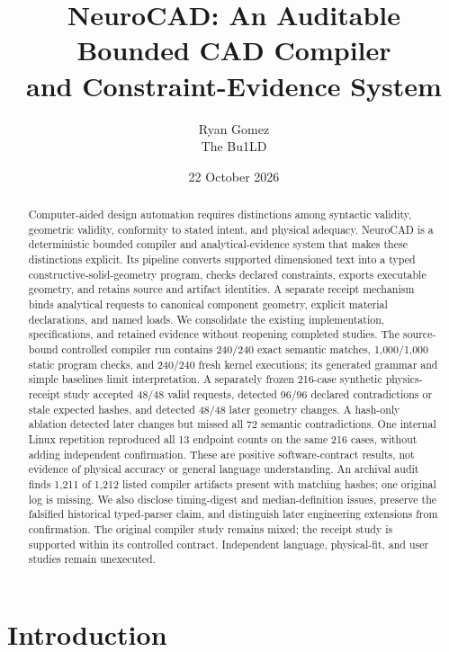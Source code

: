 \documentclass[10pt]{article}
\title{NeuroCAD: An Auditable Bounded CAD Compiler\\and Constraint-Evidence System}
\author{Ryan Gomez\\The Bu1LD}
\date{22 October 2026}
\begin{document}
\maketitle
\begin{abstract}
Computer-aided design automation requires distinctions among syntactic validity,
geometric validity, conformity to stated intent, and physical adequacy. NeuroCAD
is a deterministic bounded compiler and analytical-evidence system that makes
these distinctions explicit. Its pipeline converts supported dimensioned text
into a typed constructive-solid-geometry program, checks declared constraints,
exports executable geometry, and retains source and artifact identities.
A separate receipt mechanism binds analytical requests to canonical component
geometry, explicit material declarations, and named loads. We consolidate the
existing implementation, specifications, and retained evidence without
reopening completed studies. The source-bound controlled compiler run contains
240/240 exact semantic matches, 1,000/1,000 static program checks, and 240/240
fresh kernel executions; its generated grammar and simple baselines limit
interpretation. A separately frozen 216-case synthetic physics-receipt study
accepted 48/48 valid requests, detected 96/96 declared contradictions or stale
expected hashes, and detected 48/48 later geometry changes. A hash-only
ablation detected later changes but missed all 72 semantic contradictions.
One internal Linux repetition reproduced all 13 endpoint counts on the same
216 cases, without adding independent confirmation.
These are positive software-contract results, not evidence of physical
accuracy or general language understanding. An archival audit finds 1,211 of
1,212 listed compiler artifacts present with matching hashes; one original
log is missing. We also disclose timing-digest and median-definition issues,
preserve the falsified historical typed-parser claim, and distinguish later
engineering extensions from confirmation. The original compiler study remains
mixed; the receipt study is supported within its controlled contract.
Independent language, physical-fit, and user studies remain unexecuted.
\end{abstract}

\section{Introduction}
\end{document}
